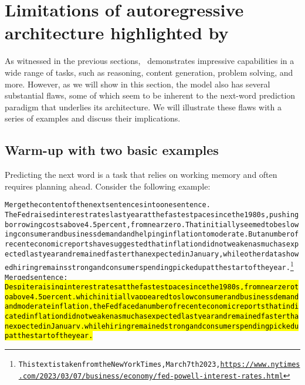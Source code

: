 \section{Limitations of autoregressive architecture highlighted by \DV}
\label{sec:limitations}
As witnessed in the previous sections, \DV\ demonstrates impressive capabilities in a wide range of tasks, such as reasoning, content generation, problem solving, and more. However, as we will show in this section, the model also has several substantial flaws, some of which seem to be inherent to the next-word prediction paradigm that underlies its architecture. We will illustrate these flaws with a series of examples and discuss their implications.

\subsection{Warm-up with two basic examples}
Predicting the next word is a task that relies on working memory and often requires planning ahead. Consider the following example:

\begin{AIbox}{\DV}
\scriptsize\vspace{-5px}
\parbox{1\textwidth}{
\begin{alltt}
Merge the content of the next sentences into one sentence. \\

The Fed raised interest rates last year at the fastest pace since the 1980s, pushing borrowing costs above 4.5 percent, from near zero. That initially seemed to be slowing consumer and business demand and helping inflation to moderate. But a number of recent economic reports have suggested that inflation did not weaken as much as expected last year and remained faster than expected in January, while other data showed hiring remains strong and consumer spending picked up at the start of the year.\footnote{This text is taken from the New York Times, March 7th 2023, \url{https://www.nytimes.com/2023/03/07/business/economy/fed-powell-interest-rates.html}} \\
    
Merged sentence: \\

\hl{ Despite raising interest rates at the fastest pace since the 1980s, from near zero to above 4.5 percent, which initially appeared to slow consumer and business demand and moderate inflation, the Fed faced a number of recent economic reports that indicated inflation did not weaken as much as expected last year and remained faster than expected in January, while hiring remained strong and consumer spending picked up at the start of the year.}
\end{alltt}
}
\end{AIbox}

